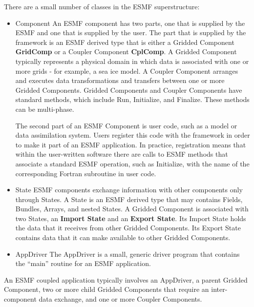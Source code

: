 There are a small number of classes in the ESMF superstructure:

\begin{itemize}
\item{Component}  An ESMF component has two parts, one that is 
supplied by the ESMF and one that is supplied by the user.  The
part that is supplied by the framework is an ESMF derived type that
is either a Gridded Component {\bf GridComp} or a Coupler 
Component {\bf CplComp}.  A Gridded Component typically represents
a physical domain in which data is associated with one or more 
grids - for example, a sea ice model.  A Coupler Component 
arranges and executes data transformations and transfers between 
one or more Gridded Components. Gridded Components and Coupler 
Components have standard methods, which include Run, Initialize,
and Finalize.  These methods can be multi-phase.

The second part of an ESMF Component is user code, such as a
model or data assimilation system.  Users register this code with 
the framework in order to make it part of an ESMF application.  
In practice, registration means that within the user-written 
software there are calls to ESMF methods that associate a 
standard ESMF operation, such as Initialize, with the name of 
the corresponding Fortran subroutine in user code.  

\item{State}  ESMF components exchange information with other 
components only through States.  A State is an ESMF derived
type that may contains Fields, Bundles, Arrays, and nested
States.  A Gridded Component  is associated with two States, an 
{\bf Import State} and an {\bf Export State}.  Its Import State 
holds the data that it receives from other Gridded Components.  
Its Export State contains data that it can make available to 
other Gridded Components. 

\item{AppDriver} The AppDriver is a small, generic 
driver program that contains the ``main'' routine for an ESMF
application.  

\end{itemize}

An ESMF coupled application typically involves an AppDriver, a parent 
Gridded Component, two or more child Gridded Components that require an 
inter-component data exchange, and one or more Coupler 
Components. 

